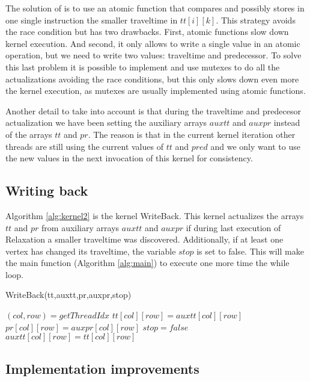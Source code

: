 The solution of \cite{Harish:2007:ALG:1782174.1782200} is
to use an atomic function that compares and possibly stores
in one single instruction the smaller traveltime in $tt[i][k]$. 
This strategy avoids the race condition but has two drawbacks. 
First, atomic functions slow down kernel execution. And second, 
it only allows to write a single value in an atomic operation, but we 
need to write two values: traveltime and predecessor. To solve this 
last problem it is possible to implement and use mutexes 
to do all the actualizations avoiding the race
conditions, but this only slows down even more the kernel 
execution, as mutexes are usually implemented using atomic
functions. 

Another detail to take into account is that during the traveltime 
and predecesor actualization we have been setting the auxiliary 
arrays $auxtt$ and $auxpr$ instead of the arrays $tt$ and $pr$. 
The reason is that in the current kernel iteration other threads
are still using the current values of $tt$ and $pred$ and we 
only want to use the new values in the next invocation of this 
kernel %
for consistency.

\subsection*{Writing back}

Algorithm \ref{alg:kernel2} is the kernel WriteBack. This
kernel actualizes the arrays $tt$ and $pr$ from
auxiliary arrays $auxtt$ and $auxpr$ if during
last execution of Relaxation a smaller traveltime 
was discovered. Additionally, if at least one vertex 
has changed its traveltime, the variable $stop$ is set 
to false. This will make the main function 
(Algorithm \ref{alg:main}) to execute one more time the 
while loop.

\begin{algorithm}
 \caption{WriteBack(tt,auxtt,pr,auxpr,stop)}
 \label{alg:kernel2}
 \begin{algorithmic}[1]
  \STATE $(col,row) = getThreadIdx$        
    \STATE $tt[col][row] = auxtt[col][row]$
    \STATE $pr[col][row] = auxpr[col][row]$
    \STATE $stop = false$
  \ENDIF
  \STATE $auxtt[col][row] = tt[col][row]$
 \end{algorithmic}
\end{algorithm}

\subsection*{Implementation improvements}


